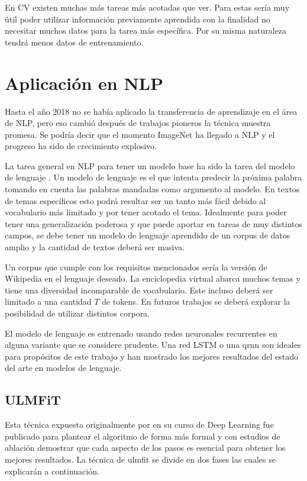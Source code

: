 En CV existen muchas más tareas más acotadas que ver. Para estas sería muy útil poder utilizar información previamente aprendida con la finalidad no necesitar muchos datos para la tarea más específica. Por su misma naturaleza tendrá menos datos de entrenamiento.

\section{Aplicación en NLP}

Hasta el año 2018 no se había aplicado la transferencia de aprendizaje en el área de NLP, pero eso cambió después de trabajos pioneros \parencite{peters:2018, howard2018, devlin2018bert} la técnica muestra promesa. Se podría decir que el momento ImageNet ha llegado a NLP y el progreso ha sido de crecimiento explosivo.

La tarea general en NLP para tener un modelo base ha sido la tarea del modelo de lenguaje \parencite{howard2018}. Un modelo de lenguaje es el que intenta predecir la próxima palabra tomando en cuenta las palabras mandadas como argumento al modelo. En textos de temas específicos esto podrá resultar ser un tanto más fácil debido al vocabulario más limitado y por tener acotado el tema. Idealmente para poder tener una generalización poderosa y que puede aportar en tareas de muy distintos campos, se debe tener un modelo de lenguaje aprendido de un corpus de datos amplio y la cantidad de textos deberá ser masiva.

Un corpus que cumple con los requisitos mencionados sería la versión de Wikipedia en el lenguaje deseado. La enciclopedia virtual abarca muchos temas y tiene una diversidad incomparable de vocabulario. Este incluso deberá ser limitado a una cantidad $T$ de tokens. En futuros trabajos se deberá explorar la posibilidad de utilizar distintos corpora.

El modelo de lenguaje es entrenado usando redes neuronales recurrentes en alguna variante que se considere prudente. Una red LSTM o una \gls{qrnn} \parencite{bradbury2016} son ideales para propósitos de este trabajo y han mostrado los mejores resultados del estado del arte en modelos de lenguaje.

\subsection{ULMFiT}

Esta técnica expuesta originalmente por \textcite{howard2018} en su curso de Deep Learning fue publicado para plantear el algoritmo de forma más formal y con estudios de ablación demostrar que cada aspecto de los pasos es esencial para obtener los mejores resultados. La técnica de \gls{ulmfit} se divide en dos fases \parencite{howard2018} las cuales se explicarán a continuación.

